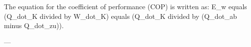 The equation for the coefficient of performance (COP) is written as:  
E_w equals (Q_dot_K divided by W_dot_K) equals (Q_dot_K divided by (Q_dot_ab minus Q_dot_zu)).  

---